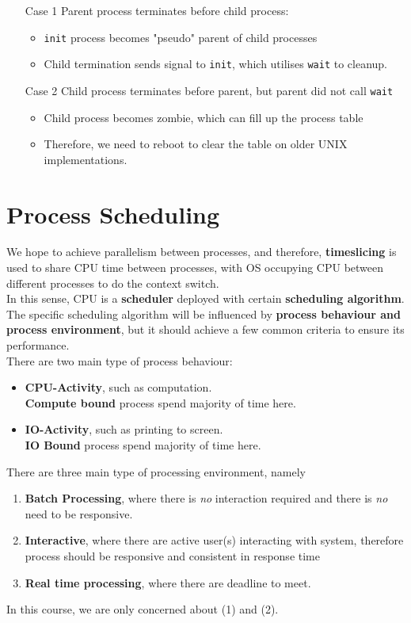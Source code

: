 \documentclass[12pt]{article}
\theoremstyle{definition}
\begin{document}
\begin{itemize}
  \item[Case 1] Parent process terminates before child process:
  \begin{itemize}
    \item \texttt{init} process becomes "pseudo" parent of child processes
    \item Child termination sends signal to \texttt{init}, which utilises \texttt{wait} to cleanup.
  \end{itemize}
  \item[Case 2] Child process terminates before parent, but parent did not call \texttt{wait}
  \begin{itemize}
    \item Child process becomes zombie, which can fill up the process table
    \item Therefore, we need to reboot to clear the table on older UNIX implementations.
  \end{itemize}
\end{itemize}

\section{Process Scheduling}
We hope to achieve parallelism between processes, and therefore, \textbf{timeslicing} is used to share CPU time between processes, with OS occupying CPU between different processes to do the context switch.\\
In this sense, CPU is a \textbf{scheduler} deployed with certain \textbf{scheduling algorithm}. The specific scheduling algorithm will be influenced by \textbf{process behaviour and process environment}, but it should achieve a few common criteria to ensure its performance.\\

There are two main type of process behaviour:
\begin{itemize}
  \item \textbf{CPU-Activity}, such as computation. \\\textbf{Compute bound} process spend majority of time here.
  \item \textbf{IO-Activity}, such as printing to screen.\\\textbf{IO Bound} process spend majority of time here.
\end{itemize}
There are three main type of processing environment, namely
\begin{enumerate}
  \item \textbf{Batch Processing}, where there is \textit{no} interaction required and there is \textit{no} need to be responsive.
  \item \textbf{Interactive}, where there are active user(s) interacting with system, therefore process should be responsive and consistent in response time
  \item \textbf{Real time processing}, where there are deadline to meet.
\end{enumerate}
In this course, we are only concerned about (1) and (2).\\
\end{document}
